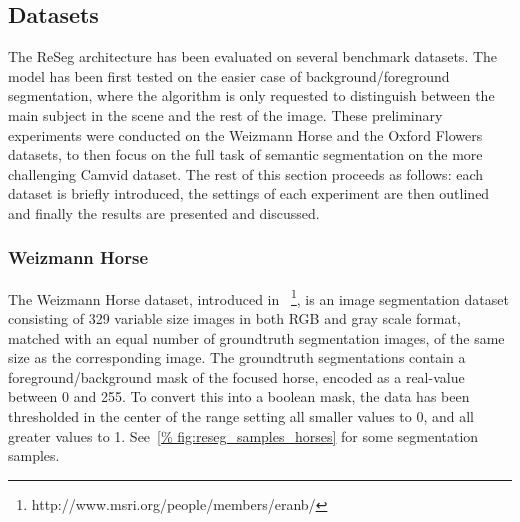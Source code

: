 \subsection{Datasets}

The ReSeg architecture has been evaluated on several benchmark datasets. The
model has been first tested on the easier case of background/foreground
segmentation, where the algorithm is only requested to distinguish between the
main subject in the scene and the rest of the image. These preliminary
experiments were conducted on the Weizmann Horse and the Oxford Flowers
datasets, to then focus on the full task of semantic segmentation on the more
challenging Camvid dataset. The rest of this section proceeds as follows: each
dataset is briefly introduced, the settings of each experiment are then
outlined and finally the results are presented and discussed.

\subsubsection{Weizmann Horse}
The Weizmann Horse dataset, introduced in~\citep{Borenstein04combiningtop-down}
\footnote{http://www.msri.org/people/members/eranb/},
is an image segmentation dataset consisting of 329 variable size images in both
RGB and gray scale format, matched with an equal number of groundtruth
segmentation images, of the same size as the corresponding image. The
groundtruth segmentations contain a foreground/background mask of the focused
horse, encoded as a real-value between 0 and 255. To convert this into a
boolean mask, the data has been thresholded in the center of the range setting
all smaller values to 0, and all greater values to 1. See~\autoref{%
fig:reseg_samples_horses} for some segmentation samples.


